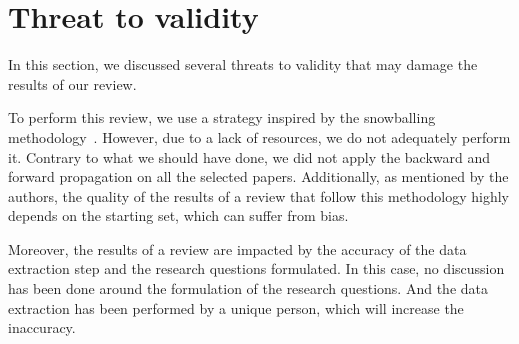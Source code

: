 \section{Threat to validity}

In this section, we discussed several threats to validity that may damage the results of our review.

To perform this review, we use a strategy inspired by the snowballing methodology~\cite{DBLP:conf/ease/Wohlin14}.
However, due to a lack of resources, we do not adequately perform it.
Contrary to what we should have done, we did not apply the backward and forward propagation on all the selected papers.
Additionally, as mentioned by the authors, the quality of the results of a review that follow this methodology highly depends on the starting set, which can suffer from bias.

Moreover, the results of a review are impacted by the accuracy of the data extraction step and the research questions formulated.
In this case, no discussion has been done around the formulation of the research questions.
And the data extraction has been performed by a unique person, which will increase the inaccuracy.

